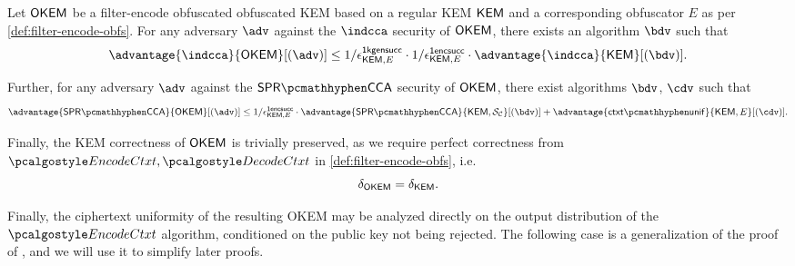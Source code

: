 \begin{theorem}
\label{thm:filter-encode-security}
    Let $\mathsf{OKEM}$ be a filter-encode obfuscated obfuscated KEM based on a regular KEM $\mathsf{KEM}$ and a corresponding obfuscator $E$ as per \cref{def:filter-encode-obfs}.
    For any adversary $\adv$ against the $\indcca$ security of $\mathsf{OKEM}$, there exists an algorithm $\bdv$ such that
    \[
        \advantage{\indcca}{\OKEM}[(\adv)]
        \leq
        1/\epsilon^\firstkeygensuccess_{\KEM,E}
        \cdot 1/\epsilon^\firstencapssuccess_{\KEM,E}
        \cdot \advantage{\indcca}{\KEM}[(\bdv)].
    \]

    Further, for any adversary $\adv$ against the $\sprcca$ security of $\mathsf{OKEM}$, there exist algorithms $\bdv$, $\cdv$ such that
    \[
        \advantage{\sprcca}{\OKEM}[(\adv)]
        \leq 
        1/\epsilon^\firstencapssuccess_{\KEM,E}
        \cdot \advantage{\sprcca}{\KEM,\simulunif}[(\bdv)]
        + \advantage{\ctxtunif}{\KEM,E}[(\cdv)].
    \]

    Finally, the KEM correctness of $\mathsf{OKEM}$ is trivially preserved, as we require perfect correctness from $\encodectxt,\decodectxt$ in \cref{def:filter-encode-obfs}, i.e.
    \[
        \delta_{\mathsf{OKEM}} = \delta_{\mathsf{KEM}}.
    \]
\end{theorem}

Finally, the ciphertext uniformity of the resulting OKEM may be analyzed directly on the output distribution of the $\encodectxt$ algorithm, conditioned on the public key not being rejected. The following case is a generalization of the proof of \cite[Lemma~2.15]{CCS:GunSteVei24}, and we will use it to simplify later proofs.

